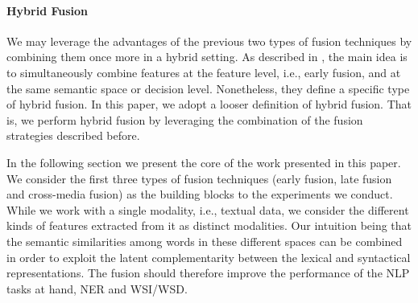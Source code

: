 \documentclass[11pt]{article}
\begin{document}
\paragraph{Hybrid Fusion}
We may leverage the advantages of the previous two types of fusion techniques by combining them once more in a hybrid setting. As described in \cite{AtreyHEK10,yu2014informedia}, the main idea is to simultaneously combine features at the feature level, i.e., early fusion, and at the same semantic space or decision level. Nonetheless, they define a specific type of hybrid fusion. In this paper, we adopt a looser definition of hybrid fusion. That is, we perform hybrid fusion by leveraging the combination of the fusion strategies described before.
%
%




In the following section we present the core of the work presented in this paper. We consider the first three types of fusion techniques (early fusion, late fusion and cross-media fusion) as the building blocks to the experiments we conduct.  While we work with a single modality, i.e., textual data, we consider the different kinds of features extracted from it as distinct modalities. Our intuition being that the semantic similarities among words in these different spaces can be combined in order to exploit the latent complementarity between the lexical and syntactical representations. The fusion should therefore improve the performance of the NLP tasks at hand, NER and WSI/WSD.
\end{document}
